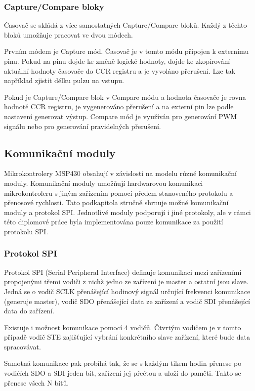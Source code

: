 \subsubsection{Capture/Compare bloky}

Časovač se skládá z více samostatných Capture/Compare bloků. Každý z těchto bloků umožňuje pracovat ve dvou módech.

Prvním módem je Capture mód. Časovač je v tomto módu připojen k externímu pinu. Pokud na pinu dojde ke změně logické hodnoty, dojde ke zkopírování aktuální hodnoty časovače do CCR registru a je vyvoláno přerušení. Lze tak například zjistit délku pulzu na vstupu.

Pokud je Capture/Compare blok v Compare módu a hodnota časovače je rovna hodnotě CCR registru, je vygenerováno přerušení a na externí pin lze podle nastavení generovat výstup. Compare mód je využíván pro generování PWM signálu nebo pro generování pravidelných přerušení.

\subsection{Komunikační moduly}

Mikrokontrolery MSP430 obsahují v závislosti na modelu různé komunikační moduly. Komunikační moduly umožňují hardwarovou komunikaci mikrokontroleru s jiným zařízením pomocí předem stanoveného protokolu a přenosové rychlosti. Tato podkapitola stručně shrnuje možné komunikační moduly a protokol SPI. Jednotlivé moduly podporují i jiné protokoly, ale v rámci této diplomové práce byla implementována pouze komunikace za použití protokolu SPI.

\subsubsection{Protokol SPI}

Protokol SPI (Serial Peripheral Interface) definuje komunikaci mezi zařízeními propojenými třemi vodiči z nichž jedno ze zařízení je master a ostatní jsou slave. Jedná se o vodič SCLK přenášející hodinový signál určující frekvenci komunikace (generuje master), vodič SDO přenášející data ze zařízení a vodič SDI přenášející data do zařízení.

Existuje i možnost komunikace pomocí 4 vodičů. Čtvrtým vodičem je v tomto případě vodič STE zajišťující vybrání konkrétního slave zařízení, které bude data spracovávat.

Samotná komunikace pak probíhá tak, že se s každým tikem hodin přenese po vodičích SDO a SDI jeden bit, zařízení jej přečtou a uloží do paměti. Takto se přenese všech N bitů.


